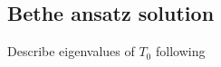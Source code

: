 \documentclass[10pt]{article}
\numberwithin{equation}{section}
\numberwithin{equation}{subsection}
\begin{document}

\subsection{Bethe ansatz solution}
Describe eigenvalues of $T_0$ following 
\cite{belliard2} 
\end{document}
